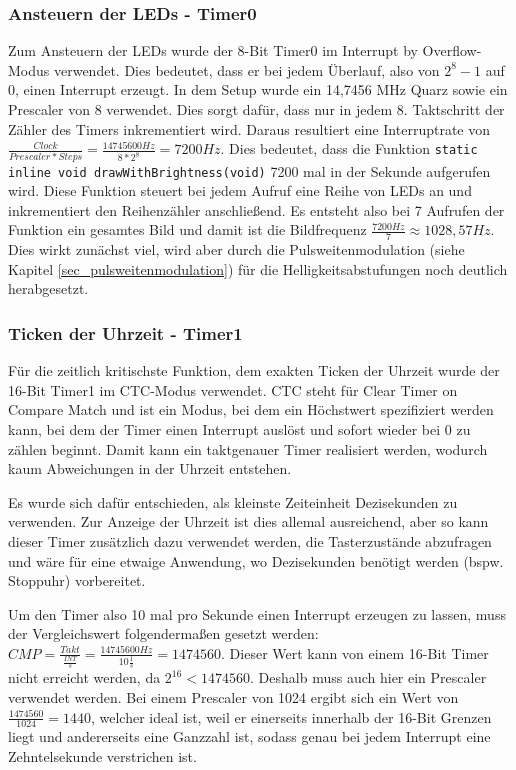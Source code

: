 \subsubsection{Ansteuern der LEDs - Timer0}\label{led_timer}
Zum Ansteuern der LEDs wurde der 8-Bit Timer0 im \glqq Interrupt by Overflow\grqq -Modus verwendet. Dies bedeutet, dass er bei jedem Überlauf, also von $2^8-1$ auf $0$, einen Interrupt erzeugt. In dem Setup wurde ein 14,7456 MHz Quarz sowie ein Prescaler von 8 verwendet. Dies sorgt dafür, dass nur in jedem 8. Taktschritt der Zähler des Timers inkrementiert wird. Daraus resultiert eine Interruptrate von $\frac{Clock}{Prescaler * Steps} = \frac{14745600 Hz}{8 * 2^8} = 7200 Hz$. Dies bedeutet, dass die Funktion \texttt{static inline void drawWithBrightness(void)} 7200 mal in der Sekunde aufgerufen wird. Diese Funktion steuert bei jedem Aufruf eine Reihe von LEDs an und inkrementiert den Reihenzähler anschließend. Es entsteht also bei 7 Aufrufen der Funktion ein gesamtes Bild und damit ist die Bildfrequenz $\frac{7200 Hz}{7} \approx 1028,57 Hz$. Dies wirkt zunächst viel, wird aber durch die Pulsweitenmodulation (siehe Kapitel \ref{sec_pulsweitenmodulation}) für die Helligkeitsabstufungen noch deutlich herabgesetzt.

\subsubsection{Ticken der Uhrzeit - Timer1}
Für die zeitlich kritischste Funktion, dem exakten Ticken der Uhrzeit wurde der 16-Bit Timer1 im \glqq CTC\grqq -Modus verwendet. CTC steht für Clear Timer on Compare Match und ist ein Modus, bei dem ein Höchstwert spezifiziert werden kann, bei dem der Timer einen Interrupt auslöst und sofort wieder bei 0 zu zählen beginnt. Damit kann ein taktgenauer Timer realisiert werden, wodurch kaum Abweichungen in der Uhrzeit entstehen.

Es wurde sich dafür entschieden, als kleinste Zeiteinheit Dezisekunden zu verwenden. Zur Anzeige der Uhrzeit ist dies allemal ausreichend, aber so kann dieser Timer zusätzlich dazu verwendet werden, die Tasterzustände abzufragen und wäre für eine etwaige Anwendung, wo Dezisekunden benötigt werden (bspw. Stoppuhr) vorbereitet.

Um den Timer also 10 mal pro Sekunde einen Interrupt erzeugen zu lassen, muss der Vergleichswert folgendermaßen gesetzt werden: $CMP = \frac{Takt}{\frac{INT}{s}} = \frac{14745600 Hz}{10 \frac{1}{s}} = 1474560$. Dieser Wert kann von einem 16-Bit Timer nicht erreicht werden, da $2^{16} < 1474560$. Deshalb muss auch hier ein Prescaler verwendet werden. Bei einem Prescaler von 1024 ergibt sich ein Wert von $\frac{1474560}{1024} = 1440$, welcher ideal ist, weil er einerseits innerhalb der 16-Bit Grenzen liegt und andererseits eine Ganzzahl ist, sodass genau bei jedem Interrupt eine Zehntelsekunde verstrichen ist.

